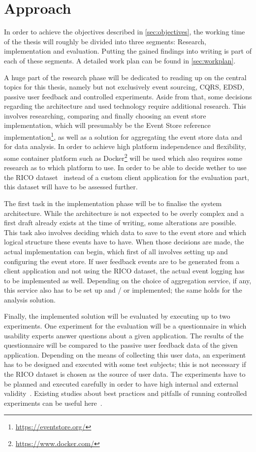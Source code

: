 %
\chapter{Approach}
\label{sec:approach}

In order to achieve the objectives described in \cref{sec:objectives}, the working time of the thesis will roughly be divided into three segments: Research, implementation and evaluation.
Putting the gained findings into writing is part of each of these segments.
A detailed work plan can be found in \cref{sec:workplan}.

A huge part of the research phase will be dedicated to reading up on the central topics for this thesis, namely but not exclusively event sourcing, \ac{CQRS}, \acl{EDSD}, passive user feedback and controlled experiments.
Aside from that, some decisions regarding the architecture and used technology require additional research.
This involves researching, comparing and finally choosing an event store implementation, which will presumably be the Event Store reference implementation\footnote{\url{https://eventstore.org/}}, as well as a solution for aggregating the event store data and for data analysis.
In order to achieve high platform independence and flexibility, some container platform such as Docker\footnote{\url{https://www.docker.com/}} will be used which also requires some research as to which platform to use.
In order to be able to decide wether to use the RICO dataset~\cite{Deka:2017:Rico} instead of a custom client application for the evaluation part, this dataset will have to be assessed further.

The first task in the implementation phase will be to finalise the system architecture.
While the architecture is not expected to be overly complex and a first draft already exists at the time of writing, some alterations are possible.
This task also involves deciding which data to save to the event store and which logical structure these events have to have.
When those decisions are made, the actual implementation can begin, which first of all involves setting up and configuring the event store.
If user feedback events are to be generated from a client application and not using the RICO dataset, the actual event logging has to be implemented as well.
Depending on the choice of aggregation service, if any, this service also has to be set up and / or implemented; the same holds for the analysis solution.

Finally, the implemented solution will be evaluated by executing up to two experiments.
One experiment for the evaluation will be a questionnaire in which usability experts answer questions about a given application.
The results of the questionnaire will be compared to the passive user feedback data of the given application.
Depending on the means of collecting this user data, an experiment has to be designed and executed with some test subjects; this is not necessary if the RICO dataset is chosen as the source of user data.
The experiments have to be planned and executed carefully in order to have high internal and external validity~\cite{Huitt2010}.
Existing studies about best practices and pitfalls of running controlled experiments can be useful here~\cite{Kohavi2009}.

